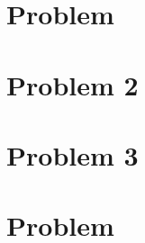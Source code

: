 \documentclass{article}
\numberwithin{equation}{section} %
\numberwithin{figure}{section} %
\begin{document}

\section{Problem}  %
\newpage \section{Problem 2}  %
\newpage \section{Problem 3}  %
\newpage \section{Problem}  %
\end{document}
